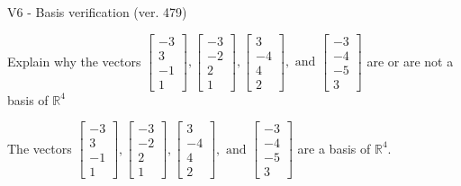 \begin{exercise}
  \begin{exerciseTitle}V6 - Basis verification (ver. 479)\end{exerciseTitle}
  \begin{exerciseStatement}
    Explain why the vectors \(\left[\begin{array}{r}
-3 \\
3 \\
-1 \\
1
\end{array}\right] , \left[\begin{array}{r}
-3 \\
-2 \\
2 \\
1
\end{array}\right] , \left[\begin{array}{r}
3 \\
-4 \\
4 \\
2
\end{array}\right] , \text{ and } \left[\begin{array}{r}
-3 \\
-4 \\
-5 \\
3
\end{array}\right]\) are or are not a basis of \(\mathbb{R}^4\)	


  \end{exerciseStatement}
  \begin{exerciseAnswer}
   The vectors \(\left[\begin{array}{r}
-3 \\
3 \\
-1 \\
1
\end{array}\right] , \left[\begin{array}{r}
-3 \\
-2 \\
2 \\
1
\end{array}\right] , \left[\begin{array}{r}
3 \\
-4 \\
4 \\
2
\end{array}\right] , \text{ and } \left[\begin{array}{r}
-3 \\
-4 \\
-5 \\
3
\end{array}\right]\) 
  	 are  a basis of \(\mathbb{R}^4\).
  


  \end{exerciseAnswer}
\end{exercise}